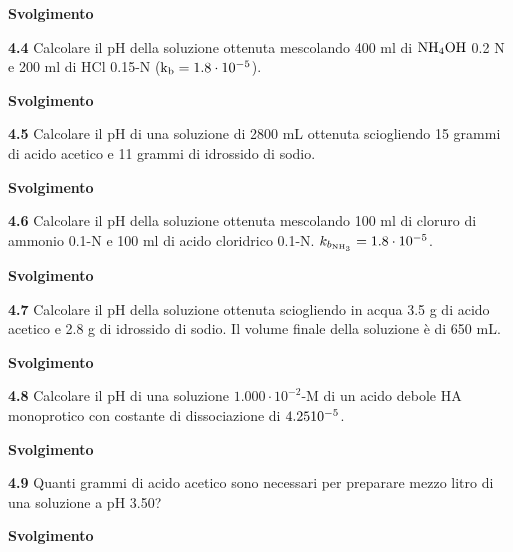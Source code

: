 \large\textbf{Svolgimento}\normalsize

\vspace{0.2cm}

\vspace{0.2cm}\textbf{4.4} Calcolare il pH della soluzione ottenuta mescolando 400 ml di $\rm NH_4OH$ 0.2 N e 200 ml di HCl 0.15-N ($\rm k_b = 1.8 \cdot 10^{-5}$).

\large\textbf{Svolgimento}\normalsize

\vspace{0.2cm}

\vspace{0.2cm}\textbf{4.5} Calcolare il pH di una soluzione di 2800 mL ottenuta sciogliendo 15 grammi di acido acetico e 11 grammi di idrossido di sodio.

\large\textbf{Svolgimento}\normalsize

\vspace{0.2cm}

\vspace{0.2cm}\textbf{4.6} Calcolare il pH della soluzione ottenuta mescolando 100 ml di cloruro di ammonio 0.1-N e 100
ml di acido cloridrico 0.1-N. $k_{b_{\rm NH_3}}=1.8 \cdot 10^{-5}$.

\large\textbf{Svolgimento}\normalsize

\vspace{0.2cm}

\vspace{0.2cm}\textbf{4.7} Calcolare il pH della soluzione ottenuta sciogliendo in acqua 3.5 g di acido acetico e 2.8 g di idrossido di sodio. Il volume finale della soluzione è di 650 mL.

\large\textbf{Svolgimento}\normalsize

\vspace{0.2cm}

\vspace{0.2cm}\textbf{4.8} Calcolare il pH di una soluzione $1.000 \cdot 10^{-2}$-M di un acido debole HA monoprotico con costante di dissociazione di $4.25 \rm  10^{-5}$.

\large\textbf{Svolgimento}\normalsize

\vspace{0.2cm}

\vspace{0.2cm}\textbf{4.9} Quanti grammi di acido acetico sono necessari per preparare mezzo litro di una soluzione a pH 3.50?

\large\textbf{Svolgimento}\normalsize

